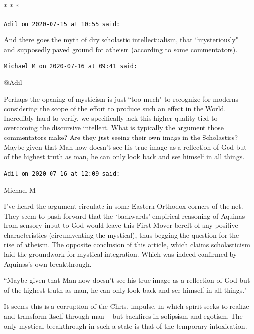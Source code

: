 
\begin{center}* * *\end{center}

\begin{footnotesize}\begin{sffamily}



\texttt{Adil on 2020-07-15 at 10:55 said: }

And there goes the myth of dry scholastic intellectualism, that ``mysteriously" and supposedly paved ground for atheism (according to some commentators).


\hfill

\texttt{Michael M on 2020-07-16 at 09:41 said: }

@Adil

Perhaps the opening of mysticism is just ``too much" to recognize for moderns considering the scope of the effort to produce such an effect in the World. Incredibly hard to verify, we specifically lack this higher quality tied to overcoming the discursive intellect. What is typically the argument those commentators make? Are they just seeing their own image in the Scholastics? Maybe given that Man now doesn't see his true image as a reflection of God but of the highest truth as man, he can only look back and see himself in all things.


\hfill

\texttt{Adil on 2020-07-16 at 12:09 said: }

Michael M

I've heard the argument circulate in some Eastern Orthodox corners of the net. They seem to push forward that the `backwards' empirical reasoning of Aquinas from sensory input to God would leave this First Mover bereft of any positive characteristics (circumventing the mystical), thus begging the question for the rise of atheism. The opposite conclusion of this article, which claims scholasticism laid the groundwork for mystical integration. Which was indeed confirmed by Aquinas's own breakthrough.

``Maybe given that Man now doesn't see his true image as a reflection of God but of the highest truth as man, he can only look back and see himself in all things."

It seems this is a corruption of the Christ impulse, in which spirit seeks to realize and transform itself through man – but backfires in solipsism and egotism. The only mystical breakthrough in such a state is that of the temporary intoxication.



\end{sffamily}
\end{footnotesize}
